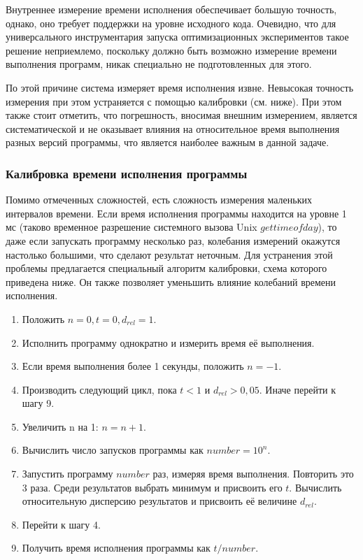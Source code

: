 Внутреннее измерение времени исполнения обеспечивает большую точность, однако, оно требует поддержки на уровне исходного кода. Очевидно, что для универсального инструментария запуска оптимизационных экспериментов такое решение неприемлемо, поскольку должно быть возможно измерение времени выполнения программ, никак специально не подготовленных для этого.

По этой причине система измеряет время исполнения извне. Невысокая точность измерения при этом устраняется с помощью калибровки (см. ниже). При этом также стоит отметить, что погрешность, вносимая внешним измерением, является систематической и не оказывает влияния на относительное время выполнения разных версий программы, что является наиболее важным в данной задаче.

\subsubsection{Калибровка времени исполнения программы}
\label{sssect:calibration}
Помимо отмеченных сложностей, есть сложность измерения маленьких интервалов времени. Если время исполнения программы находится на уровне 1 мс (таково временное разрешение системного вызова Unix $gettimeofday$), то даже если запускать программу несколько раз, колебания измерений окажутся настолько большими, что сделают результат неточным. Для устранения этой проблемы предлагается специальный алгоритм калибровки, схема которого приведена ниже. Он также позволяет уменьшить влияние колебаний времени исполнения.

\begin{enumerate}
    \item Положить $n = 0, t = 0, d_{rel} = 1$.
    \item Исполнить программу однократно и измерить время её выполнения.
    \item Если время выполнения более 1 секунды, положить $n = -1$.
    \item Производить следующий цикл, пока $t < 1$ и $d_{rel} > 0,05$. Иначе перейти к шагу 9.
    \item Увеличить n на 1: $n = n + 1$.
    \item Вычислить число запусков программы как $number = 10^{n}$.
    \item Запустить программу $number$ раз, измеряя время выполнения. Повторить это 3 раза. Среди результатов выбрать минимум и присвоить его $t$. Вычислить относительную дисперсию результатов и присвоить её величине $d_{rel}$.
    \item Перейти к шагу 4.
    \item Получить время исполнения программы как $t / number$.
\end{enumerate}

